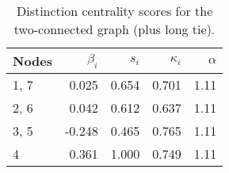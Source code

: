 \begin{table}
\centering
\caption{\label{tab:tcl}Distinction centrality scores for the two-connected graph (plus long tie).}
\centering
\begin{tabular}[t]{lrrrr}
\toprule
Nodes & $\beta_i$ & $s_i$ & $\kappa_i$ & $\alpha$\\
\midrule
1, 7 & 0.025 & 0.654 & 0.701 & 1.11\\
2, 6 & 0.042 & 0.612 & 0.637 & 1.11\\
3, 5 & -0.248 & 0.465 & 0.765 & 1.11\\
4 & 0.361 & 1.000 & 0.749 & 1.11\\
\bottomrule
\end{tabular}
\end{table}
